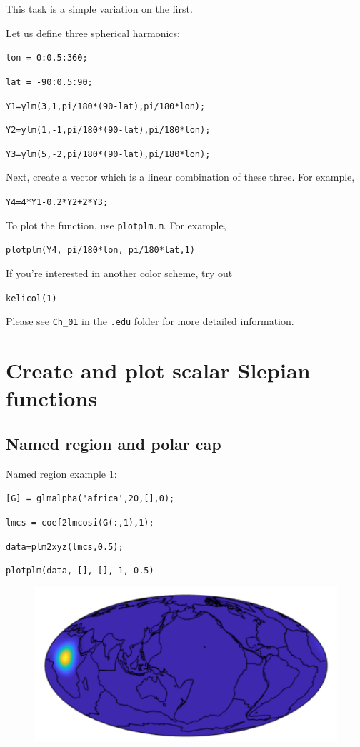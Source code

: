 \documentclass{article}
\begin{document}
\setlength{\parskip}{0.5cm plus4mm minus3mm}

This task is a simple variation on the first. 

Let us define three spherical harmonics:

\verb+lon = 0:0.5:360;+

\verb+lat = -90:0.5:90;+

\verb+Y1=ylm(3,1,pi/180*(90-lat),pi/180*lon);+

\verb+Y2=ylm(1,-1,pi/180*(90-lat),pi/180*lon);+

\verb+Y3=ylm(5,-2,pi/180*(90-lat),pi/180*lon);+

Next, create a vector which is a linear combination of these three. For example,

\verb!Y4=4*Y1-0.2*Y2+2*Y3;!

To plot the function, use \verb+plotplm.m+. For example,

\verb+plotplm(Y4, pi/180*lon, pi/180*lat,1)+

If you're interested in another color scheme, try out 

\verb+kelicol(1)+

Please see \verb+Ch_01+ in the \verb+.edu+ folder for more detailed information.

\section{Create and plot scalar Slepian functions}

\subsection{Named region and polar cap}

Named region example 1:

\vspace{2mm}

\setlength{\parskip}{.1mm}

\verb![G] = glmalpha('africa',20,[],0);!

\verb!lmcs = coef2lmcosi(G(:,1),1);!

\verb!data=plm2xyz(lmcs,0.5);!

\verb!plotplm(data, [], [], 1, 0.5)!

\begin{figure}[H]
\includegraphics[scale=.75]{africa_ex_1}
\end{figure}
\end{document}
